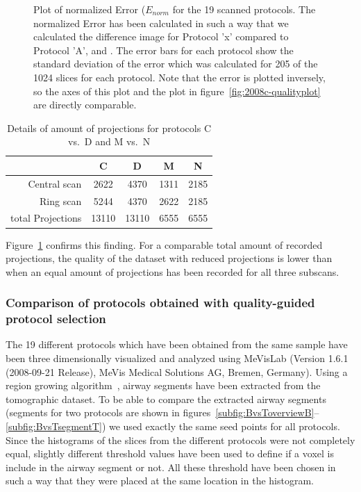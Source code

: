 \begin{figure}
	\centering
	
	\caption{Plot of normalized Error ($E_{norm}$ for the 19 scanned protocols. The normalized Error has been calculated in such a way that we calculated the difference image for Protocol 'x' compared to Protocol 'A',  and . The error bars for each protocol show the standard deviation of the error which was calculated for 205 of the 1024 slices for each protocol. Note that the error is plotted inversely, so the axes of this plot and the plot in figure~\ref{fig:2008c-qualityplot} are directly comparable.}
	\label{fig:NormalizedErrorPlot}
\end{figure}

\begin{table}%
	\centering
	\caption{Details of amount of projections for protocols C vs.\ D and M vs.\ N}
	\begin{tabular}{rcccc}
		\toprule
							& C 	& D 	& M 	& N \\
		\midrule
		Central scan		& 2622 	& 4370	& 1311 	& 2185 \\
		Ring scan	 		& 5244 	& 4370  & 2622 	& 2185 \\
		\midrule
		total Projections	& 13110	& 13110	& 6555	& 6555 \\
		\bottomrule
	\end{tabular}  
	\label{tab:detailsCDMN}
\end{table}

Figure~\ref{fig:NormalizedErrorPlot} confirms this finding. For a comparable total amount of recorded projections, the quality of the dataset with reduced projections is lower than when an equal amount of projections has been recorded for all three subscans.

\subsubsection{Comparison of protocols obtained with quality-guided protocol selection}
The 19 different protocols which have been obtained from the same sample have been three dimensionally visualized and analyzed using MeVisLab (Version 1.6.1 (2008-09-21 Release), MeVis Medical Solutions AG, Bremen, Germany). Using a region growing algorithm~\cite{wiki:regiongrowing}, airway segments have been extracted from the tomographic dataset. To be able to compare the extracted airway segments (segments for two protocols are shown in figures~\ref{subfig:BvsToverviewB}--\ref{subfig:BvsTsegmentT}) we used exactly the same seed points for all protocols. Since the histograms of the slices from the different protocols were not completely equal, slightly different threshold values have been used to define if a voxel is include in the airway segment or not. All these threshold have been chosen in such a way that they were placed at the same location in the histogram.

